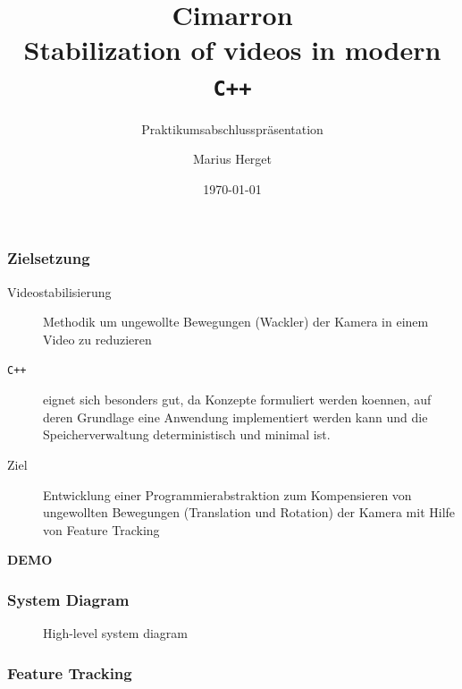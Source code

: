 \documentclass{beamer}
\title{\textbf{Cimarron}\\Stabilization of videos in modern \texttt{C++}}
\subtitle{Praktikumsabschlusspr\"asentation}
\author{Marius Herget}
\date{\today}
\institute{Institut f\"ur Informatik, LMU M\"unchen}
\newcommand{\currentSD}{}
\begin{document}
\frame{\titlepage}

\begin{frame}
\frametitle{Zielsetzung}
\begin{description}
    \item[Videostabilisierung] Methodik um ungewollte Bewegungen (Wackler) der Kamera in einem Video zu reduzieren
    \item[\texttt{C++}] eignet sich besonders gut, da Konzepte formuliert werden koennen, auf deren Grundlage eine Anwendung implementiert werden kann und die Speicherverwaltung deterministisch und minimal ist.
    \item[Ziel] Entwicklung einer Programmierabstraktion zum Kompensieren von ungewollten Bewegungen (Translation und Rotation) der Kamera mit Hilfe von Feature Tracking
\end{description}
\end{frame}

\begin{frame}
\begin{center}
    \textbf{\huge DEMO}
\end{center}
\end{frame}

\begin{frame}
    \frametitle{System Diagram}
    \begin{figure}[h!]
        \resizebox{\textwidth}{!}{%
        }
        \caption{High-level system diagram}
    \end{figure}
\end{frame}

\begin{frame}
\frametitle{Feature Tracking}

    \renewcommand{\currentSD}{\draw[red,thick,dotted] ($(analysis1.north west)+(-0.2,0.2)$)  rectangle ($(analysis1.south east)+(0.2,-0.2)$);}
    
\end{frame}
\end{document}
